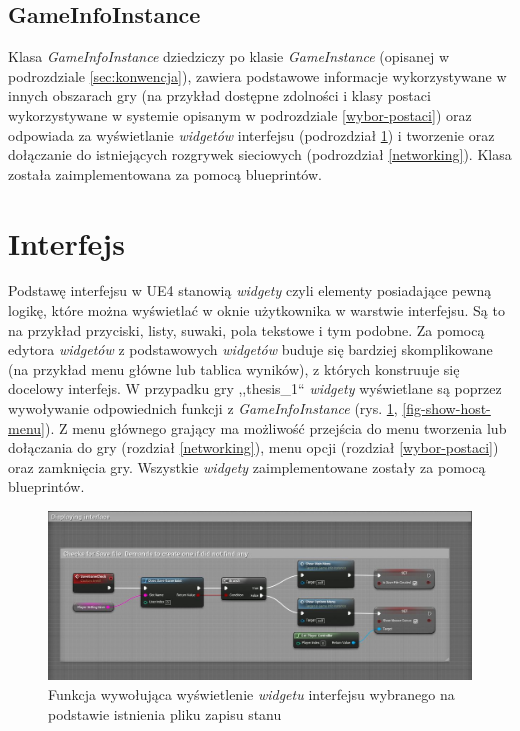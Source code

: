 \documentclass[multip]{SGGW-thesis}
\begin{document}
	\subsection{GameInfoInstance}
		\label{gameinfoinstance}
		Klasa {\em GameInfoInstance} dziedziczy po klasie {\em GameInstance} (opisanej w podrozdziale \ref{sec:konwencja}), zawiera podstawowe informacje wykorzystywane w innych obszarach gry (na przykład dostępne zdolności i klasy postaci wykorzystywane w systemie opisanym w podrozdziale \ref{wybor-postaci}) oraz odpowiada za wyświetlanie {\em widgetów} interfejsu (podrozdział \ref{interface}) i tworzenie oraz dołączanie do istniejących rozgrywek sieciowych (podrozdział \ref{networking}). Klasa została zaimplementowana za pomocą blueprintów.
	

\section{Interfejs}
	\label{interface}
	Podstawę interfejsu w UE4 stanowią {\em widgety} czyli elementy posiadające pewną logikę, które można wyświetlać w oknie użytkownika w warstwie interfejsu. Są to na przykład przyciski, listy, suwaki, pola tekstowe i tym podobne. Za pomocą edytora {\em widgetów} z podstawowych {\em widgetów} buduje się bardziej skomplikowane (na przykład menu główne lub tablica wyników), z których konstruuje się docelowy interfejs.
\newline \indent W przypadku gry ,,thesis\_1`` {\em widgety} wyświetlane są poprzez wywoływanie odpowiednich funkcji z {\em GameInfoInstance} (rys. \ref{fig-save-game-check}, \ref{fig-show-host-menu}). 
\newline \indent Z menu głównego grający ma możliwość przejścia do menu tworzenia lub dołączania do gry (rozdział \ref{networking}), menu opcji (rozdział \ref{wybor-postaci}) oraz zamknięcia gry. Wszystkie {\em widgety} zaimplementowane zostały za pomocą blueprintów.

	\begin{figure}
		\centering
			\includegraphics[width=1\textwidth]{figures/savegamecheck.jpg}
		\caption{Funkcja wywołująca wyświetlenie {\em widgetu} interfejsu wybranego na podstawie istnienia pliku zapisu stanu}
		\label{fig-save-game-check}
	\end{figure}
	
\end{document}
